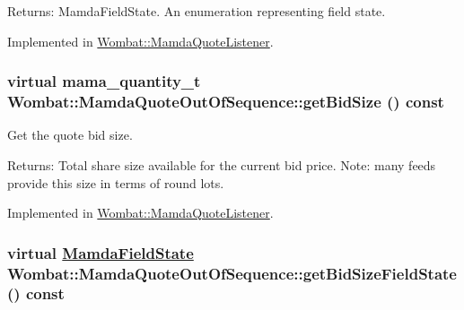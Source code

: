 \begin{Desc}
\item[Returns:]Mamda\-Field\-State. An enumeration representing field state. \end{Desc}


Implemented in \hyperlink{classWombat_1_1MamdaQuoteListener_edb910c741c98a43134d0abcb325079e}{Wombat::Mamda\-Quote\-Listener}.\hypertarget{classWombat_1_1MamdaQuoteOutOfSequence_75acf46a72e24b7d535bdcc4d495566a}{
\subsubsection[getBidSize]{\setlength{\rightskip}{0pt plus 5cm}virtual mama\_\-quantity\_\-t Wombat::Mamda\-Quote\-Out\-Of\-Sequence::get\-Bid\-Size () const}}
\label{classWombat_1_1MamdaQuoteOutOfSequence_75acf46a72e24b7d535bdcc4d495566a}


Get the quote bid size. 

\begin{Desc}
\item[Returns:]Total share size available for the current bid price. Note: many feeds provide this size in terms of round lots. \end{Desc}


Implemented in \hyperlink{classWombat_1_1MamdaQuoteListener_578f45a1ddaa18b8447cda08b943153e}{Wombat::Mamda\-Quote\-Listener}.\hypertarget{classWombat_1_1MamdaQuoteOutOfSequence_349931c22f5522b07b991efc90c06140}{
\subsubsection[getBidSizeFieldState]{\setlength{\rightskip}{0pt plus 5cm}virtual \hyperlink{namespaceWombat_93aac974f2ab713554fd12a1fa3b7d2a}{Mamda\-Field\-State} Wombat::Mamda\-Quote\-Out\-Of\-Sequence::get\-Bid\-Size\-Field\-State () const}}
\label{classWombat_1_1MamdaQuoteOutOfSequence_349931c22f5522b07b991efc90c06140}


